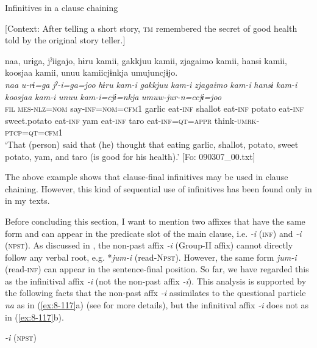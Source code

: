 \ea\label{ex:8-116}
  Infinitives in a clause chaining

  [Context: After telling a short story, \textsc{tm} remembered the secret of good health told by the original story teller.]

  {\TM}
\glll  naa,  urɨga,  jˀiigajo,  hɨru  kamii,  gakkjuu    kamii,  {\textbar}zjagaimo{\textbar}  kamii,  hansɨ  kamii,  koosjaa  kamii,    unuu  kamiicjɨnkja  umujuncjɨjo.\\
\textit{naa}  \textit{u-rɨ=ga}  \textit{jˀ-i=ga=joo}  \textit{hɨru}  \textit{kam-i}  \textit{gakkjuu}    \textit{kam-i}  \textit{zjagaimo}  \textit{kam-i}  \textit{hansɨ}  \textit{kam-i}  \textit{koosjaa}  \textit{kam-i}    \textit{unuu}  \textit{kam-i=cjɨ=nkja}  \textit{umuw-jur-n=ccjɨ=joo}\\
    \textsc{fil}  \textsc{mes}-\textsc{nlz}=\textsc{nom}  say-\textsc{inf}=\textsc{nom}=\textsc{cfm1}  garlic  eat-\textsc{inf}  shallot  eat-\textsc{inf}  potato  eat-\textsc{inf}  sweet.potato  eat-\textsc{inf}  yam  eat-\textsc{inf}  taro  eat-\textsc{inf}=\textsc{qt}=\textsc{appr}  think-\textsc{umrk}-\textsc{ptcp}=\textsc{qt}=\textsc{cfm1}\\
\glt ‘That (person) said that (he) thought that eating garlic, shallot, potato, sweet potato, yam, and taro (is good for his health).’ [Fo: 090307\_00.txt]
\z

The above example shows that clause-final infinitives may be used in clause chaining. However, this kind of sequential use of infinitives has been found only in  in my texts.

Before concluding this section, I want to mention two affixes that have the same form and can appear in the predicate slot of the main clause, i.e. \textit{-i} (\textsc{inf}) and \textit{-i} (\textsc{npst}). As discussed in , the non-past affix \textit{-i} (Group-II affix) cannot directly follow any verbal root, e.g. *\textit{jum-i} (read-N\textsc{pst}). However, the same form \textit{jum-i} (read-\textsc{inf}) can appear in the sentence-final position. So far, we have regarded this as the infinitival affix \textit{-i} (not the non-past affix \textit{-i}). This analysis is supported by the following facts that the non-past affx \textit{-i} assimilates to the questional particle \textit{na} as in (\ref{ex:8-117}a) (see  for more details), but the infinitival affix \textit{-i} does not as in (\ref{ex:8-117}b).

\ea\label{ex:8-117}
\ea \textit{-i} (\textsc{npst})

